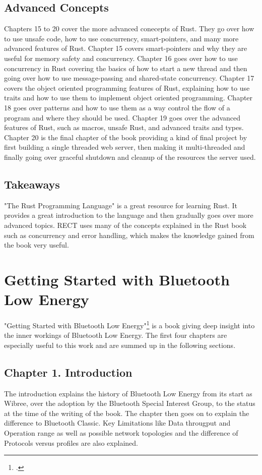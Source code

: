 \subsection{Advanced Concepts}
Chapters 15 to 20 cover the more advanced conecepts of Rust. They go over how to use unsafe code, how to use concurrency, smart-pointers, and many more advanced
features of Rust. Chapter 15 covers smart-pointers and why they are useful for memory safety and concurrency. Chapter 16 goes over how to use concurrency in Rust
covering the basics of how to start a new thread and then going over how to use message-passing and shared-state concurrency. Chapter 17 covers the object oriented
programming features of Rust, explaining how to use traits and how to use them to implement object oriented programming. Chapter 18 goes over patterns and how to use
them as a way control the flow of a program and where they should be used. Chapter 19 goes over the advanced features of Rust, such as macros, unsafe Rust, and advanced traits
and types. Chapter 20 is the final chapter of the book providing a kind of final project by first building a single threaded web server, then making it multi-threaded and 
finally going over graceful shutdown and cleanup of the resources the server used.  

\subsection{Takeaways}
"The Rust Programming Language" is a great resource for learning Rust. It provides a great introduction to the language and then gradually goes over more advanced topics.
RECT uses many of the concepts explained in the Rust book such as concurrency and error handling, which makes the knowledge gained from the book very useful.

\section{Getting Started with Bluetooth Low Energy}
"Getting Started with Bluetooth Low Energy"\footcite{ble-getting-started} is a book giving deep insight into
the inner workings of Bluetooth Low Energy. The first four chapters are especially useful to this
work and are summed up in the following sections.

\subsection{Chapter 1. Introduction}
The introduction explains the history of Bluetooth Low
Energy from its start as Wibree, over the adoption by the Bluetooth Special Interest Group, to
the status at the time of the writing of the book. The chapter then goes on to explain the difference
to Bluetooth Classic. Key Limitations like Data througput and Operation range as well as possible network
topologies and the difference of Protocols versus profiles are also explained.  

